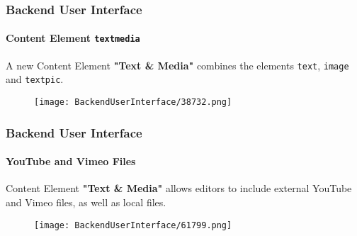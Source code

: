 \begin{frame}[fragile]
	\frametitle{Backend User Interface}
	\framesubtitle{Content Element \texttt{textmedia}}

	A new Content Element \textbf{"Text \& Media"} combines the elements
	\texttt{text}, \texttt{image} and \texttt{textpic}.

	\begin{figure}
		\texttt{[image: BackendUserInterface/38732.png]}
	\end{figure}

\end{frame}

\begin{frame}[fragile]
	\frametitle{Backend User Interface}
	\framesubtitle{YouTube and Vimeo Files}

	Content Element \textbf{"Text \& Media"} allows editors to include external
	YouTube and Vimeo files, as well as local files.

	\begin{figure}
		\texttt{[image: BackendUserInterface/61799.png]}
	\end{figure}

\end{frame}

